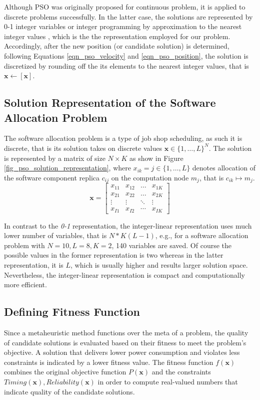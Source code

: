 Although PSO was originally proposed for continuous problem, it is applied to discrete problems successfully. In the latter case, the solutions are represented by 0-1 integer variables \cite{KennedyAAlgorithm} or integer programming by approximation to the nearest integer values \cite{Clerc2000DiscreteProblem}, which is the the representation employed for our problem. Accordingly, after the new position (or candidate solution) is determined, following Equations \ref{eqn_pso_velocity} and \ref{eqn_pso_position}, the solution is discretized by rounding off the its elements to the nearest integer values, that is $\textbf{x}\leftarrow [\textbf{x}]$.

\subsection{Solution Representation of the Software Allocation Problem}
The software allocation problem is a type of job shop scheduling, as such it is discrete, that is its solution takes on discrete values $\textbf{x}\in \{1,…,L\}^N$. The solution is represented by a matrix of size $N\times K$ as show in Figure \ref{fig_pso_solution_representation}, where $x_{ik}=j\in \{1,…,L\}$ denotes allocation of the software component replica $c_{ij}$ on the computation node $m_j$, that is $c_{ik}\mapsto m_j$.
\begin{equation}
\label{fig_pso_solution_representation}
\textbf{x}=
\begin{bmatrix} 
x_{11} & x_{12} & \dots & x_{1K}\\
x_{21} & x_{22} & \dots & x_{2K}\\
\vdots & \vdots & \ddots & \vdots\\
x_{I1} & x_{I2} & \cdots & x_{IK}
\end{bmatrix}
\end{equation}

In contrast to the \textit{0-1} representation, the integer-linear representation uses much lower number of variables, that is $N*K(L-1)$, e.g., for a software allocation problem with $N=10,L=8,K=2$, 140 variables are saved. Of course the possible values in the former representation is two whereas in the latter representation, it is $L$, which is usually higher and results larger solution space. Nevertheless, the integer-linear representation is compact and computationally more efficient.

\subsection{Defining Fitness Function}
Since a metaheuristic method functions over the meta of a problem, the quality of candidate solutions is evaluated based on their fitness to meet the problem's objective. A solution that delivers lower power consumption and violates less constraints is indicated by a lower fitness value. The fitness function $f(\textbf{x})$ combines the original objective function $P(\textbf{x})$ and the constraints $Timing(\textbf{x}),Reliability(\textbf{x})$ in order to compute real-valued numbers that indicate quality of the candidate solutions.


